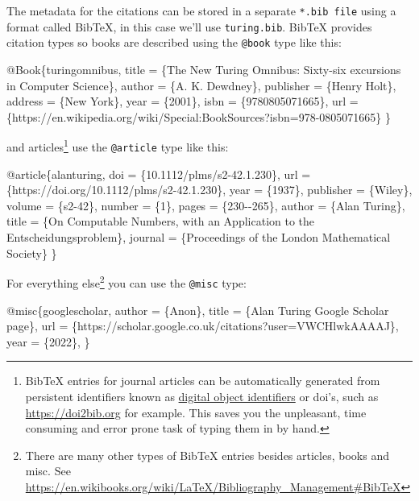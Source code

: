 \documentclass[
]{book}
\newenvironment{Shaded}{\begin{snugshade}}{\end{snugshade}}
\newcommand{\NormalTok}[1]{#1}
\begin{document}
The metadata for the citations can be stored in a separate \texttt{*.bib\ file} using a format called BibTeX, in this case we'll use \texttt{turing.bib}. BibTeX provides citation types so books are described using the \texttt{@book} type like this:

\begin{Shaded}
\begin{Highlighting}[]
\NormalTok{@Book\{turingomnibus,}
\NormalTok{  title = \{The New Turing Omnibus: Sixty{-}six excursions in Computer Science\},}
\NormalTok{  author = \{A. K. Dewdney\},}
\NormalTok{  publisher = \{Henry Holt\},}
\NormalTok{  address = \{New York\},}
\NormalTok{  year = \{2001\},}
\NormalTok{  isbn = \{9780805071665\},}
\NormalTok{  url = \{https://en.wikipedia.org/wiki/Special:BookSources?isbn=978{-}0805071665\}}
\NormalTok{\}}
\end{Highlighting}
\end{Shaded}

and articles\footnote{BibTeX entries for journal articles can be automatically generated from persistent identifiers known as \href{https://en.wikipedia.org/wiki/Digital_object_identifier}{digital object identifiers} or doi's, such as \url{https://doi2bib.org} for example. This saves you the unpleasant, time consuming and error prone task of typing them in by hand.} use the \texttt{@article} type like this:

\begin{Shaded}
\begin{Highlighting}[]
\NormalTok{@article\{alanturing,}
\NormalTok{  doi = \{10.1112/plms/s2{-}42.1.230\},}
\NormalTok{  url = \{https://doi.org/10.1112/plms/s2{-}42.1.230\},}
\NormalTok{  year = \{1937\},}
\NormalTok{  publisher = \{Wiley\},}
\NormalTok{  volume = \{s2{-}42\},}
\NormalTok{  number = \{1\},}
\NormalTok{  pages = \{230{-}{-}265\},}
\NormalTok{  author = \{Alan Turing\},}
\NormalTok{  title = \{On Computable Numbers, with an Application to the Entscheidungsproblem\},}
\NormalTok{  journal = \{Proceedings of the London Mathematical Society\}}
\NormalTok{\}}
\end{Highlighting}
\end{Shaded}

For everything else\footnote{There are many other types of BibTeX entries besides articles, books and misc. See \url{https://en.wikibooks.org/wiki/LaTeX/Bibliography_Management\#BibTeX}} you can use the \texttt{@misc} type:

\begin{Shaded}
\begin{Highlighting}[]
\NormalTok{@misc\{googlescholar,}
\NormalTok{  author       = \{Anon\},}
\NormalTok{  title        = \{Alan Turing Google Scholar page\},}
\NormalTok{  url          = \{https://scholar.google.co.uk/citations?user=VWCHlwkAAAAJ\},}
\NormalTok{  year         = \{2022\},}
\NormalTok{\}}
\end{Highlighting}
\end{Shaded}
\end{document}
